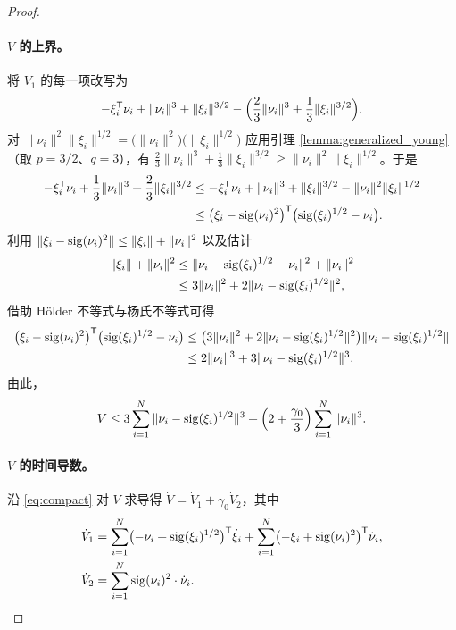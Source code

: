 \begin{proof}
    \paragraph{$V$ 的上界。}
    将 $V_1$ 的每一项改写为
    \[
    -\xi_i^\mathsf{T}\nu_i + \|\nu_i\|^3 + \|\xi_i\|^{3/2} - \Bigl(\frac{2}{3}\|\nu_i\|^3 + \frac{1}{3}\|\xi_i\|^{3/2}\Bigr).
    \]
    对 $\|\nu_i\|^2\|\xi_i\|^{1/2}=\bigl(\|\nu_i\|^2\bigr)\bigl(\|\xi_i\|^{1/2}\bigr)$ 应用引理 \ref{lemma:generalized_young}（取 $p=3/2$、$q=3$），有 $\frac{2}{3}\|\nu_i\|^3 + \frac{1}{3}\|\xi_i\|^{3/2} \ge \|\nu_i\|^2\|\xi_i\|^{1/2}$。于是
    \begin{align*}
        -\xi_i^\mathsf{T}\nu_i + \frac{1}{3}\|\nu_i\|^3 + \frac{2}{3}\|\xi_i\|^{3/2}
        &\le -\xi_i^\mathsf{T}\nu_i + \|\nu_i\|^3 + \|\xi_i\|^{3/2} - \|\nu_i\|^2\|\xi_i\|^{1/2}\\
        &\le \bigl(\xi_i - \operatorname{sig}(\nu_i)^2\bigr)^\mathsf{T}\bigl(\operatorname{sig}(\xi_i)^{1/2}-\nu_i\bigr).
    \end{align*}
    利用 $\|\xi_i - \operatorname{sig}(\nu_i)^2\| \le \|\xi_i\| + \|\nu_i\|^2$ 以及估计
    \begin{align*}
        \|\xi_i\| + \|\nu_i\|^2 
        &\le \|\nu_i - \operatorname{sig}(\xi_i)^{1/2} - \nu_i\|^2 + \|\nu_i\|^2 \\
        &\le 3\|\nu_i\|^2 + 2\|\nu_i - \operatorname{sig}(\xi_i)^{1/2}\|^2,
    \end{align*}
    借助 Hölder 不等式与杨氏不等式可得
    \begin{align*}
        \bigl(\xi_i - \operatorname{sig}(\nu_i)^2\bigr)^\mathsf{T}
        \bigl(\operatorname{sig}(\xi_i)^{1/2}-\nu_i\bigr)
        &\le \bigl(3\|\nu_i\|^2
        + 2\|\nu_i - \operatorname{sig}(\xi_i)^{1/2}\|^2\bigr)
        \|\nu_i - \operatorname{sig}(\xi_i)^{1/2}\|\\
        &\le 2\|\nu_i\|^3 + 3\|\nu_i - \operatorname{sig}(\xi_i)^{1/2}\|^3.
    \end{align*}
    由此，
    \begin{equation}\label{eq:V_bound}
        V \le 3\sum_{i=1}^{N}\|\nu_i - \operatorname{sig}(\xi_i)^{1/2}\|^3 + \Bigl(2 + \frac{\gamma_0}{3}\Bigr)\sum_{i=1}^{N}\|\nu_i\|^3.
    \end{equation}

    \paragraph{$V$ 的时间导数。}
    沿 \eqref{eq:compact} 对 $V$ 求导得 $\dot{V}=\dot{V}_1 + \gamma_0 \dot{V}_2$，其中
    \begin{align*}
        \dot{V}_1 &=\sum_{i=1}^{N}\bigl(-\nu_i + \operatorname{sig}(\xi_i)^{1/2}\bigr)^\mathsf{T}\dot{\xi}_i 
                   + \sum_{i=1}^{N}\bigl(-\xi_i + \operatorname{sig}(\nu_i)^2\bigr)^\mathsf{T}\dot{\nu}_i,\\
        \dot{V}_2 &= \sum_{i=1}^{N}\operatorname{sig}(\nu_i)^2 \cdot \dot{\nu}_i.
    \end{align*}


\end{proof}
